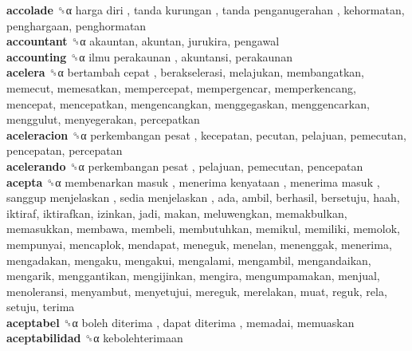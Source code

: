 \textbf{accolade} ␝α   harga diri ,  tanda kurungan ,  tanda penganugerahan , kehormatan, penghargaan, penghormatan  \\
\textbf{accountant} ␝α  akauntan, akuntan, jurukira, pengawal  \\
\textbf{accounting} ␝α   ilmu perakaunan , akuntansi, perakaunan  \\
\textbf{acelera} ␝α   bertambah cepat , berakselerasi, melajukan, membangatkan, memecut, memesatkan, mempercepat, mempergencar, memperkencang, mencepat, mencepatkan, mengencangkan, menggegaskan, menggencarkan, menggulut, menyegerakan, percepatkan  \\
\textbf{aceleracion} ␝α   perkembangan pesat , kecepatan, pecutan, pelajuan, pemecutan, pencepatan, percepatan  \\
\textbf{acelerando} ␝α   perkembangan pesat , pelajuan, pemecutan, pencepatan  \\
\textbf{acepta} ␝α   membenarkan masuk ,  menerima kenyataan ,  menerima masuk ,  sanggup menjelaskan ,  sedia menjelaskan , ada, ambil, berhasil, bersetuju, haah, iktiraf, iktirafkan, izinkan, jadi, makan, meluwengkan, memakbulkan, memasukkan, membawa, membeli, membutuhkan, memikul, memiliki, memolok, mempunyai, mencaplok, mendapat, meneguk, menelan, menenggak, menerima, mengadakan, mengaku, mengakui, mengalami, mengambil, mengandaikan, mengarik, menggantikan, mengijinkan, mengira, mengumpamakan, menjual, menoleransi, menyambut, menyetujui, mereguk, merelakan, muat, reguk, rela, setuju, terima  \\
\textbf{aceptabel} ␝α   boleh diterima ,  dapat diterima , memadai, memuaskan  \\
\textbf{aceptabilidad} ␝α  kebolehterimaan  \\

